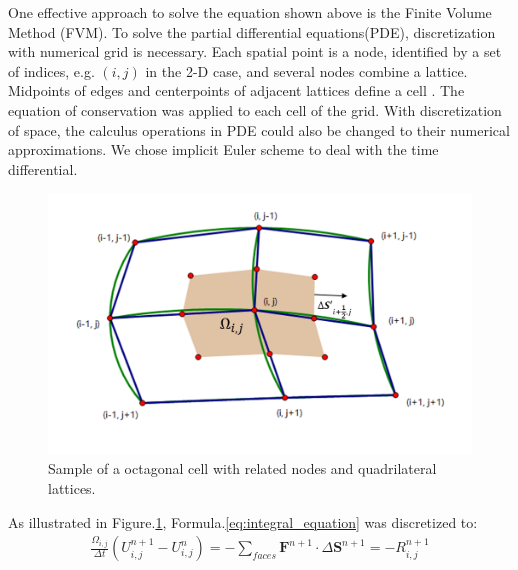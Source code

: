 \documentclass[%
 reprint,
 amsmath,amssymb,
pra,
]{revtex4-1}
\begin{document}
One effective approach to solve the equation shown above is the Finite Volume Method (FVM). To solve the partial differential equations(PDE), discretization with numerical grid is necessary. Each spatial point is a node, identified by a set of indices, e.g. $\left(i, j\right)$ in the 2-D case, and several nodes combine a lattice. Midpoints of edges and centerpoints of adjacent lattices define a cell \cite{economon2015su2}. The equation of conservation was applied to each cell of the grid. With discretization of space, the calculus operations in PDE could also be changed to their numerical approximations. We chose implicit Euler scheme to deal with the time differential.
\begin{figure}[h]
	\centering  
	\includegraphics[width=0.7\linewidth]{Fig/grid}
	\caption{Sample of a octagonal cell with related nodes and quadrilateral lattices.}
	\label{fig:sample_of_cell}
\end{figure}

As illustrated in Figure.\ref{fig:sample_of_cell}, Formula.\ref{eq:integral_equation} was discretized to:
\begin{align}
	\frac{\Omega_{i, j}}{\Delta t}\left(U^{n+1}_{i, j}-U^{n}_{i, j} \right) = -\sum_{faces}\bm{F}^{n+1}\cdot\Delta\bm{S}^{n+1} = -R^{n+1}_{i, j}
\end{align}
\end{document}
